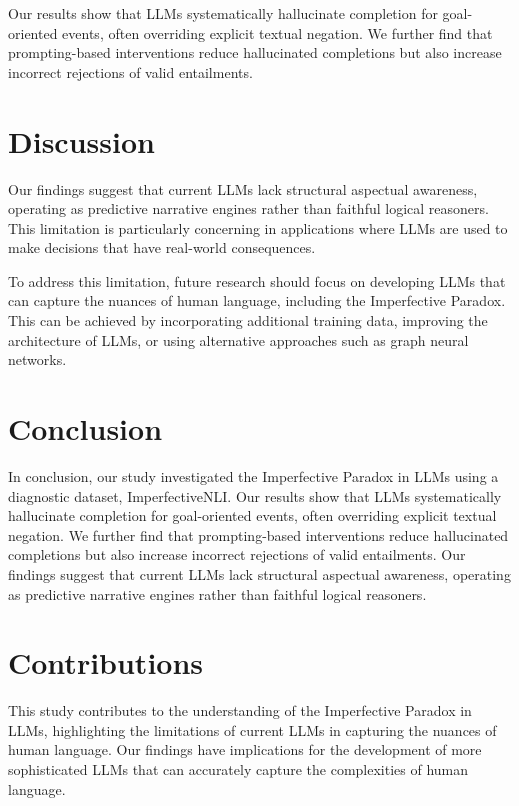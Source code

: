 \documentclass{article}
\begin{document}
    Our results show that LLMs systematically hallucinate completion for goal-oriented events, often overriding explicit textual negation. We further find that prompting-based interventions reduce hallucinated completions but also increase incorrect rejections of valid entailments.

\section*{Discussion}
    \vspace{-0.5cm}
    Our findings suggest that current LLMs lack structural aspectual awareness, operating as predictive narrative engines rather than faithful logical reasoners. This limitation is particularly concerning in applications where LLMs are used to make decisions that have real-world consequences.

    To address this limitation, future research should focus on developing LLMs that can capture the nuances of human language, including the Imperfective Paradox. This can be achieved by incorporating additional training data, improving the architecture of LLMs, or using alternative approaches such as graph neural networks.

\section*{Conclusion}
    \vspace{-0.5cm}
    In conclusion, our study investigated the Imperfective Paradox in LLMs using a diagnostic dataset, ImperfectiveNLI. Our results show that LLMs systematically hallucinate completion for goal-oriented events, often overriding explicit textual negation. We further find that prompting-based interventions reduce hallucinated completions but also increase incorrect rejections of valid entailments. Our findings suggest that current LLMs lack structural aspectual awareness, operating as predictive narrative engines rather than faithful logical reasoners.

\section*{Contributions}
    \vspace{-0.5cm}
    This study contributes to the understanding of the Imperfective Paradox in LLMs, highlighting the limitations of current LLMs in capturing the nuances of human language. Our findings have implications for the development of more sophisticated LLMs that can accurately capture the complexities of human language.
\end{document}
